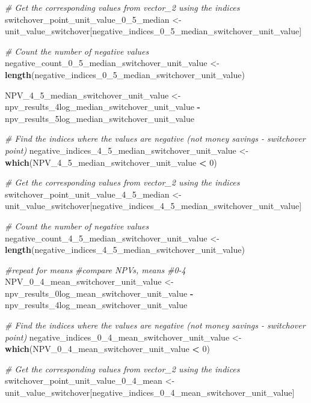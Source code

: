 \documentclass[
]{article}
\newenvironment{Shaded}{\begin{snugshade}}{\end{snugshade}}
\newcommand{\CommentTok}[1]{\textcolor[rgb]{0.56,0.35,0.01}{\textit{#1}}}
\newcommand{\DecValTok}[1]{\textcolor[rgb]{0.00,0.00,0.81}{#1}}
\newcommand{\FunctionTok}[1]{\textcolor[rgb]{0.13,0.29,0.53}{\textbf{#1}}}
\newcommand{\NormalTok}[1]{#1}
\newcommand{\OtherTok}[1]{\textcolor[rgb]{0.56,0.35,0.01}{#1}}
\newcommand{\SpecialCharTok}[1]{\textcolor[rgb]{0.81,0.36,0.00}{\textbf{#1}}}
\begin{document}
\begin{Shaded}
\begin{Highlighting}[]
\CommentTok{\# Get the corresponding values from vector\_2 using the indices}
\NormalTok{switchover\_point\_unit\_value\_0\_5\_median }\OtherTok{\textless{}{-}}\NormalTok{ unit\_value\_switchover[negative\_indices\_0\_5\_median\_switchover\_unit\_value]}

\CommentTok{\# Count the number of negative values}
\NormalTok{negative\_count\_0\_5\_median\_switchover\_unit\_value }\OtherTok{\textless{}{-}} \FunctionTok{length}\NormalTok{(negative\_indices\_0\_5\_median\_switchover\_unit\_value)}


\NormalTok{NPV\_4\_5\_median\_switchover\_unit\_value }\OtherTok{\textless{}{-}}\NormalTok{ npv\_results\_4log\_median\_switchover\_unit\_value }\SpecialCharTok{{-}}\NormalTok{ npv\_results\_5log\_median\_switchover\_unit\_value}

\CommentTok{\# Find the indices where the values are negative (not money savings {-} switchover point)}
\NormalTok{negative\_indices\_4\_5\_median\_switchover\_unit\_value }\OtherTok{\textless{}{-}} \FunctionTok{which}\NormalTok{(NPV\_4\_5\_median\_switchover\_unit\_value }\SpecialCharTok{\textless{}} \DecValTok{0}\NormalTok{)}

\CommentTok{\# Get the corresponding values from vector\_2 using the indices}
\NormalTok{switchover\_point\_unit\_value\_4\_5\_median }\OtherTok{\textless{}{-}}\NormalTok{ unit\_value\_switchover[negative\_indices\_4\_5\_median\_switchover\_unit\_value]}

\CommentTok{\# Count the number of negative values}
\NormalTok{negative\_count\_4\_5\_median\_switchover\_unit\_value }\OtherTok{\textless{}{-}} \FunctionTok{length}\NormalTok{(negative\_indices\_4\_5\_median\_switchover\_unit\_value)}



\CommentTok{\#repeat for means}
\CommentTok{\#compare NPVs, means}
\CommentTok{\#0{-}4}
\NormalTok{NPV\_0\_4\_mean\_switchover\_unit\_value }\OtherTok{\textless{}{-}}\NormalTok{ npv\_results\_0log\_mean\_switchover\_unit\_value }\SpecialCharTok{{-}}\NormalTok{ npv\_results\_4log\_mean\_switchover\_unit\_value}

\CommentTok{\# Find the indices where the values are negative (not money savings {-} switchover point)}
\NormalTok{negative\_indices\_0\_4\_mean\_switchover\_unit\_value }\OtherTok{\textless{}{-}} \FunctionTok{which}\NormalTok{(NPV\_0\_4\_mean\_switchover\_unit\_value }\SpecialCharTok{\textless{}} \DecValTok{0}\NormalTok{)}

\CommentTok{\# Get the corresponding values from vector\_2 using the indices}
\NormalTok{switchover\_point\_unit\_value\_0\_4\_mean }\OtherTok{\textless{}{-}}\NormalTok{ unit\_value\_switchover[negative\_indices\_0\_4\_mean\_switchover\_unit\_value]}


\end{Highlighting}
\end{Shaded}
\end{document}
